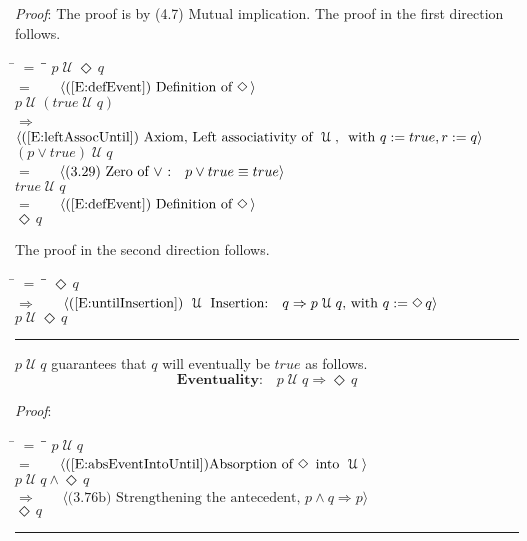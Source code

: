 \documentclass[12pt, fleqn, leqno]{article}
\newcommand{\lgap}{2pt}                             %
\newcommand{\mymathindent}{24pt}                    %
\newcommand{\impl}{\ensuremath{\Rightarrow}}        %
\newcommand{\Until}{\;\mathcal{U}\;}
\newcommand{\Event}{\Diamond\,}
\newcommand{\myqed}{\rule[-.23ex]{1.2ex}{2.0ex}}
\newcommand{\myqedtab}{\hspace{384pt}}              %
\newcommand{\Gll} {\langle}                         %
\newcommand{\Ggg} {\rangle}                         %
\newcommand{\Hint}[1]     {\ \ \ $\Gll              \mbox{#1} \Ggg$ }   %
\begin{document}
\emph{Proof}: The proof is by (4.7) Mutual implication.
The proof in the first direction follows.
\begin{tabbing}
\hspace{\mymathindent} \= $= \;$ \= \myqedtab \= \kill
\> \> $p \Until \Event q$\\[\lgap]
\> $=$ \> \Hint{(\ref{E:defEvent}) Definition of $\Event$} \\[\lgap]
\>\> $p \Until (true \Until q)$\\[\lgap]
\> $\impl$ \> \Hint{(\ref{E:leftAssocUntil}) {Axiom, Left associativity of $\Until$, } with $q := true, r := q$} \\[\lgap]
\> \> $(p \lor true) \Until q$\\[\lgap]
\> $=$ \> \Hint{(3.29) {Zero of $\lor$ :}\quad $p\lor true\equiv true$} \\[\lgap]
\> \> $true \Until q$\\[\lgap]
\> $=$ \> \Hint{(\ref{E:defEvent}) Definition of $\Event$} \\[\lgap]
\> \> $\Event q$

\end{tabbing}
The proof in the second direction follows.
\begin{tabbing}
\hspace{\mymathindent} \= $= \;$ \= \myqedtab \= \kill
\> \> $ \Event q$\\[\lgap]
\> $\impl$ \> \Hint{(\ref{E:untilInsertion}) {$\Until$ Insertion:}$\quad q \impl p \Until q$, with $q := \Event q$} \\[\lgap]
\> \> $p \Until \Event q$ \quad \myqed
\end{tabbing}

$p\Until q$ guarantees that $q$ will eventually be $true$ as follows.
\begin{equation}\label{E:eventuality}
\textbf{Eventuality:}\quad p \Until q \impl \Event q
\end{equation}

\emph{Proof}:
\begin{tabbing}
\hspace{\mymathindent} \= $= \;$ \= \myqedtab \= \kill
  \> \>   $p \Until q$\\[\lgap]
  \> $=$  \>  \Hint{(\ref{E:absEventIntoUntil})Absorption of $\Event$ into $\Until$}\\[\lgap]
  \> \>   $p \Until q \land \Event q$\\[\lgap]
  \> $\impl$  \>  \Hint{(3.76b) Strengthening the antecedent, $p\land q \impl p$}\\[\lgap]
  \> \>   $\Event q$ \quad \myqed
\end{tabbing}
\end{document}
